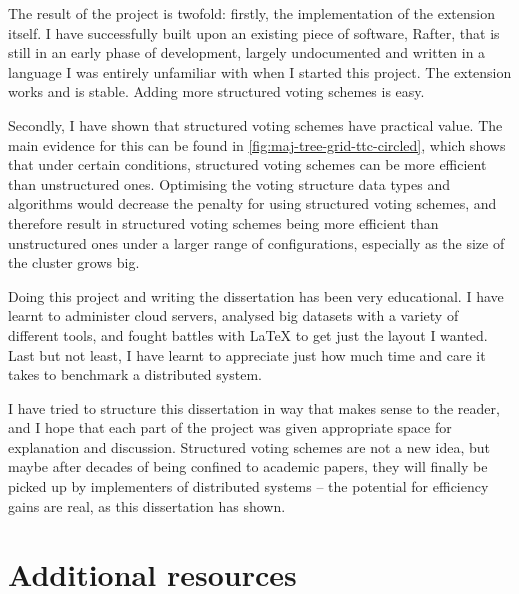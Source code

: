 \documentclass[12pt,chapterprefix=true,toc=bibliography,numbers=noendperiod,
               footnotes=multiple,twoside]{scrreprt}
\begin{document}

The result of the project is twofold: firstly, the implementation of the extension itself. I have successfully built upon an existing piece of software, Rafter, that is still in an early phase of development, largely undocumented and written in a language I was entirely unfamiliar with when I started this project. The extension works and is stable. Adding more structured voting schemes is easy.

Secondly, I have shown that structured voting schemes have practical value. The main evidence for this can be found in \cref{fig:maj-tree-grid-ttc-circled}, which shows that under certain conditions, structured voting schemes can be more efficient than unstructured ones. Optimising the voting structure data types and algorithms would decrease the penalty for using structured voting schemes, and therefore result in structured voting schemes being more efficient than unstructured ones under a larger range of configurations, especially as the size of the cluster grows big.


Doing this project and writing the dissertation has been very educational. I have learnt to administer cloud servers, analysed big datasets with a variety of different tools, and fought battles with \LaTeX{} to get just the layout I wanted. Last but not least, I have learnt to appreciate just how much time and care it takes to benchmark a distributed system.


I have tried to structure this dissertation in way that makes sense to the reader, and I hope that each part of the project was given appropriate space for explanation and discussion. Structured voting schemes are not a new idea, but maybe after decades of being confined to academic papers, they will finally be picked up by implementers of distributed systems -- the potential for efficiency gains are real, as this dissertation has shown.


\printbibliography


\appendix



\chapter{Additional resources}
\end{document}
